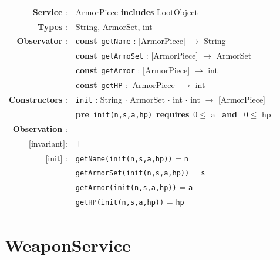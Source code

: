 \documentclass[12pt]{report}
\begin{document}
\begin{tabular}{rl}
    \textbf{Service} : & ArmorPiece \textbf{includes} LootObject \\

    \textbf{Types} : & \textrm{String}, \textrm{ArmorSet}, \textrm{int} \\

    \textbf{Observator} : & \textbf{const}~\texttt{getName} : \textrm{[ArmorPiece]} $\rightarrow$ \textrm{String} \\
    & \textbf{const}~\texttt{getArmoSet} : \textrm{[ArmorPiece]} $\rightarrow$ \textrm{ArmorSet} \\
    & \textbf{const}~\texttt{getArmor} : \textrm{[ArmorPiece]} $\rightarrow$ \textrm{int} \\
    & \textbf{const}~\texttt{getHP} : \textrm{[ArmorPiece]} $\rightarrow$ \textrm{int} \\

    \textbf{Constructors} : & \texttt{init} : \textrm{String} $\cdot$ \textrm{ArmorSet} $\cdot$ \textrm{int} $\cdot$ \textrm{int} $\rightarrow$ \textrm{[ArmorPiece]} \\
    & \quad\quad \textbf{pre}~\texttt{init(n,s,a,hp)}~\textbf{requires}~$0 \leq$ a ~\textbf{and}~ $0 \leq$ hp  \\

    \textbf{Observation} : \\
    $[$invariant$]$: & $\top$ \\
    $[$init$]$ : & \texttt{getName(init(n,s,a,hp))} = \texttt{n} \\
    & \texttt{getArmorSet(init(n,s,a,hp))} = \texttt{s} \\
    & \texttt{getArmor(init(n,s,a,hp))} = \texttt{a} \\
    & \texttt{getHP(init(n,s,a,hp))} = \texttt{hp} \\
\end{tabular}

\section{WeaponService}
\end{document}
